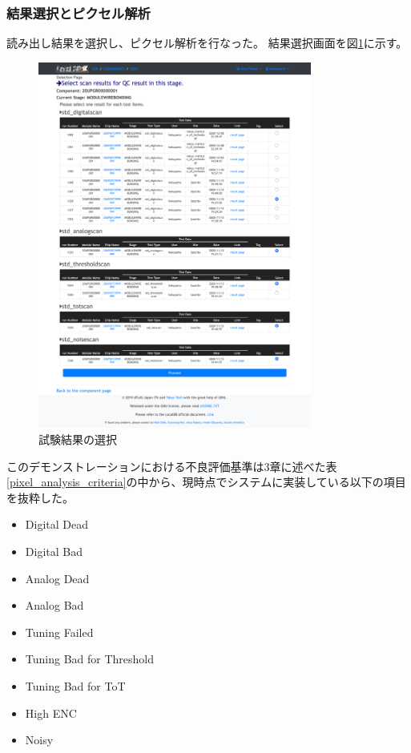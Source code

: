\clearpage
\subsubsection{結果選択とピクセル解析}
読み出し結果を選択し、ピクセル解析を行なった。
結果選択画面を図\ref{demo_select_scans}に示す。

\begin{figure}[bpt]\centering
  \begin{center}
    \includegraphics[width=9cm]{demo_select_scans}
  \caption[試験結果の選択]{試験結果の選択}
  \label{demo_select_scans}
  \end{center}
\end{figure}

このデモンストレーションにおける不良評価基準は3章に述べた表\ref{pixel_analysis_criteria}の中から、現時点でシステムに実装している以下の項目を抜粋した。
\begin{itemize}
  \item Digital Dead 
  \item Digital Bad 
  \item Analog Dead 
  \item Analog Bad 
  \item Tuning Failed
  \item Tuning Bad for Threshold
  \item Tuning Bad for ToT
  \item High ENC
  \item Noisy
\end{itemize}

